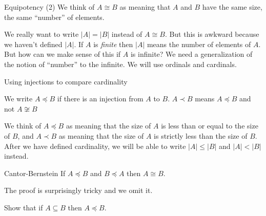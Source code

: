 \documentclass[pdf,final]{prosper}
\newcommand{\skipsmall}{\vspace{1em}}
\newcommand{\skipmed}{\vspace{2em}}
\begin{document}
\begin{slide}{Equipotency (2)}
We think of $A\cong B$ as meaning that $A$ and $B$ have the same size, the same
``number'' of elements.

\skipmed

\begin{remark}
We really want to write $|A| = |B|$ instead of $A\cong B$. But this is awkward
because we haven't defined $|A|$. If $A$ is \emph{finite} then $|A|$ means the
number of elements of $A$. But how can we make sense of this if $A$ is infinite?
We need a generalization of the notion of ``number'' to the infinite. We will
use ordinals and cardinals.
\end{remark}

\end{slide}

\begin{slide}{Using injections to compare cardinality}
\begin{definition}
We write $A\preceq B$ if there is an injection from $A$ to $B$.
$A\prec B$ means $A\preceq B$ and  not $A\not\cong B$
\end{definition}

\skipsmall

We think of $A\preceq B$ as meaning that the size of $A$ is less than or equal
to the size of $B$, and $A\prec B$ as meaning that the size of $A$ is strictly less than the
size of $B$. After we have defined cardinality, we will be able to
write $|A|\leq|B|$ and $|A|<|B|$ instead.

\skipsmall

\begin{theorem}{Cantor-Bernstein}
If $A\preceq B$ and $B\preceq A$ then $A\cong B$.
\end{theorem}

\skipsmall

The proof is surprisingly tricky and we omit it.

\skipsmall

\begin{exercise}
Show that if $A\subseteq B$ then $A\preceq B$.
\end{exercise}



\end{slide}
\end{document}

